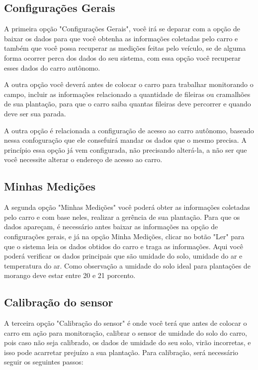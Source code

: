 \begin{apendicesenv}
\subsection{Configurações Gerais}

A primeira opção "Configurações Gerais", você irá se deparar com a opção de baixar os dados para que você obtenha as informações
coletadas pelo carro e também que você possa recuperar as medições feitas pelo veículo, se de alguma forma ocorrer perca dos dados
do seu sistema, com essa opção você recuperar esses dados do carro autônomo.

A outra opção você deverá antes de colocar o carro para trabalhar monitorando o campo, incluir as informações relacionado a quantidade
de fileiras ou cramalhões de sua plantação, para que o carro saiba quantas fileiras deve percorrer e quando deve ser sua parada.

A outra opção é relacionada a configuração de acesso ao carro autônomo, baseado nessa confoguração que ele consefuirá mandar os
dados que o mesmo precisa. A princípio essa opção já vem configurada, não precisando alterá-la, a não ser que você necessite
alterar o endereço de acesso ao carro.

\subsection{Minhas Medições}

A segunda opção "Minhas Medições" você poderá obter as informações coletadas pelo carro e com base neles, realizar a gerência
de sua plantação. Para que os dados apareçam, é necessário antes baixar as informações na opção de configurações gerais, e já
na opção Minha Medições, clicar no botão "Ler" para que o sistema leia os dados obtidos do carro e traga as informações.
Aqui você poderá verificar os dados principais que são umidade do solo, umidade do ar e temperatura do ar. Como observação a
umidade do solo ideal para plantações de morango deve estar entre 20 e 21 porcento.

\subsection{Calibração do sensor}

A terceira opção "Calibração do sensor" é onde você terá que antes de colocar o carro em ação para monitoração, calibrar
o sensor de umidade do solo do carro, pois caso não seja calibrado, os dados de umidade do seu solo, virão incorretas, e
isso pode acarretar prejuízo a sua plantação. Para calibração, será necessário seguir os seguintes passos:


\end{apendicesenv}
